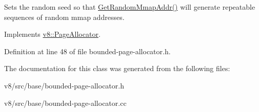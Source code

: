Sets the random seed so that \mbox{\hyperlink{classv8_1_1base_1_1BoundedPageAllocator_aafb1cb9ac6fed20bdba0806a46f28bfc}{Get\+Random\+Mmap\+Addr()}} will generate repeatable sequences of random mmap addresses. 

Implements \mbox{\hyperlink{classv8_1_1PageAllocator_a9481a73527915fd200f6e1e9ed4b3eba}{v8\+::\+Page\+Allocator}}.



Definition at line 48 of file bounded-\/page-\/allocator.\+h.



The documentation for this class was generated from the following files\+:\begin{DoxyCompactItemize}
\item 
v8/src/base/bounded-\/page-\/allocator.\+h\item 
v8/src/base/bounded-\/page-\/allocator.\+cc\end{DoxyCompactItemize}
